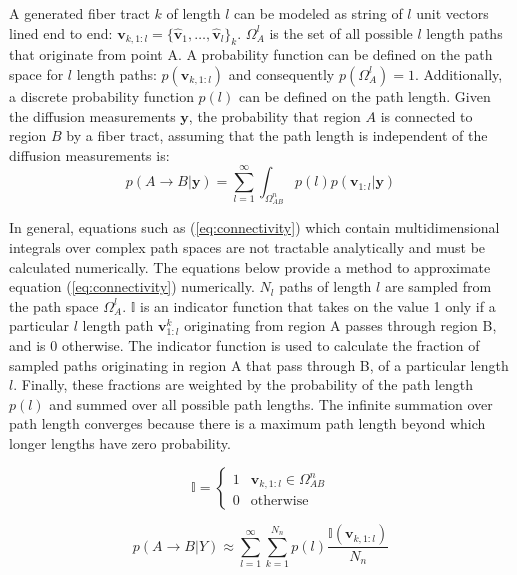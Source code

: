 A generated fiber tract $k$ of length $l$ can be modeled as string of $l$ unit vectors lined end to end: $\mathbf{v}_{k, 1:l} = \{\mathbf{\hat{v}}_1,\ldots,\mathbf{\hat{v}}_l\}_k$.  $\Omega_A^l$ is the set of all possible $l$ length paths that originate from point A.  A probability function can be defined on the path space for $l$ length paths: $p(\mathbf{v}_{k, 1:l})$ and consequently $p(\Omega_A^l)=1$.  Additionally, a discrete probability function $p(l)$ can be defined on the path length.
Given the diffusion measurements $\mathbf{y}$, the probability that region $A$ is connected to region $B$ by a fiber tract, assuming that the path length is independent of the diffusion measurements is:
\begin{equation} \label{eq:connectivity}
p(A\rightarrow B|\mathbf{y}) = \sum_{l=1}^{\infty} \int_{\Omega_{AB}^n}p(l)p(\mathbf{v}_{1:l}|\mathbf{y})
\end{equation}

In general, equations such as (\ref{eq:connectivity}) which contain multidimensional integrals over complex path spaces are not tractable analytically and must be calculated numerically.  The equations below provide a method to approximate equation (\ref{eq:connectivity}) numerically.  $N_l$ paths of length $l$ are sampled from the path space $\Omega_A^l$.  $\mathbb{I}$ is an indicator function that takes on the value 1 only if a particular $l$ length path $\mathbf{v}_{1:l}^k$ originating from region A passes through region B, and is 0 otherwise.  The indicator function is used to calculate the fraction of sampled paths originating in region A that pass through B, of a particular length $l$.  Finally, these fractions are weighted by the probability of the path length $p(l)$ and summed over all possible path lengths.  The infinite summation over path length converges because there is a maximum path length beyond which longer lengths have zero probability.

\begin{equation} \label{eq:indicator}
\mathbb{I} = \left\{ \begin{array}{ll}
	1 & \mathbf{v}_{k, 1:l} \in \Omega_{AB}^n \\
	0 & \textrm{otherwise}
	\end{array} \right.
\end{equation}

\begin{equation} \label{eq:numconnectivity}
p(A\rightarrow B|Y) \approx \sum_{l=1}^\infty \sum_{k=1}^{N_n} p(l) \frac{\mathbb{I}(\mathbf{v}_{k,1:l})}{N_n}
\end{equation}

